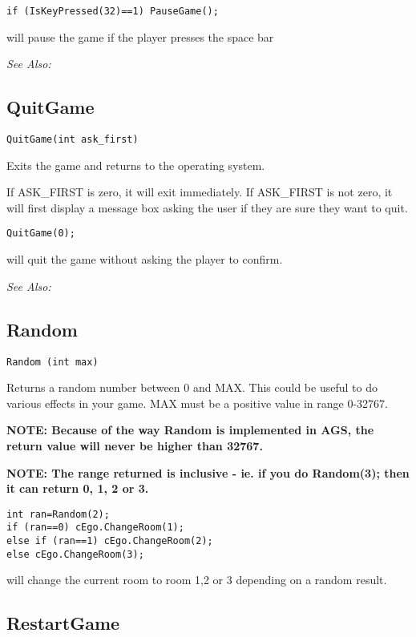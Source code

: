 \begin{verbatim}
if (IsKeyPressed(32)==1) PauseGame();
\end{verbatim}
will pause the game if the player presses the space bar

\it{See Also:} 


\subsection{QuitGame}\label{QuitGame}%

\begin{verbatim}
QuitGame(int ask_first)
\end{verbatim}
Exits the game and returns to the operating system.

If ASK_FIRST is zero, it will exit immediately. If ASK_FIRST is not zero,
it will first display a message box asking the user if they are sure they
want to quit.

\begin{verbatim}
QuitGame(0);
\end{verbatim}
will quit the game without asking the player to confirm.

\it{See Also:} 


\subsection{Random}\label{Random}%

\begin{verbatim}
Random (int max)
\end{verbatim}
Returns a random number between 0 and MAX. This could be useful to do
various effects in your game. MAX must be a positive value in range 0-32767.

\bf{NOTE:} Because of the way Random is implemented in AGS, the return value will never be higher than 32767.

\bf{NOTE:} The range returned is inclusive - ie. if you do  Random(3);  then it
can return 0, 1, 2 or 3.

\begin{verbatim}
int ran=Random(2);
if (ran==0) cEgo.ChangeRoom(1);
else if (ran==1) cEgo.ChangeRoom(2);
else cEgo.ChangeRoom(3);
\end{verbatim}
will change the current room to room 1,2 or 3 depending on a random result.


\subsection{RestartGame}\label{RestartGame}%

